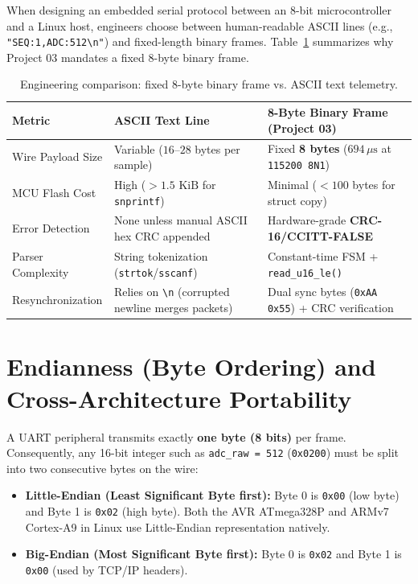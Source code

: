 \documentclass[11pt,a4paper,oneside]{report}
\begin{document}
When designing an embedded serial protocol between an 8-bit microcontroller and a Linux host, engineers choose between human-readable ASCII lines (e.g., \texttt{"SEQ:1,ADC:512\textbackslash n"}) and fixed-length binary frames. Table~\ref{tab:ch2_bin_vs_ascii} summarizes why Project 03 mandates a fixed 8-byte binary frame.

\begin{table}[!htbp]
\centering
\caption{Engineering comparison: fixed 8-byte binary frame vs. ASCII text telemetry.}
\label{tab:ch2_bin_vs_ascii}
\begin{tabularx}{\linewidth}{l X X}
\toprule
\textbf{Metric} & \textbf{ASCII Text Line} & \textbf{8-Byte Binary Frame (Project 03)} \\
\midrule
Wire Payload Size & Variable ($16\text{--}28$ bytes per sample) & Fixed \textbf{8 bytes} ($694\,\mu\text{s}$ at \texttt{115200 8N1}) \\
MCU Flash Cost & High ($>1.5\text{ KiB}$ for \texttt{snprintf}) & Minimal ($<100$ bytes for struct copy) \\
Error Detection & None unless manual ASCII hex CRC appended & Hardware-grade \textbf{CRC-16/CCITT-FALSE} \\
Parser Complexity & String tokenization (\texttt{strtok}/\texttt{sscanf}) & Constant-time FSM + \texttt{read\_u16\_le()} \\
Resynchronization & Relies on \texttt{\textbackslash n} (corrupted newline merges packets) & Dual sync bytes (\texttt{0xAA 0x55}) + CRC verification \\
\bottomrule
\end{tabularx}
\end{table}

\section{Endianness (Byte Ordering) and Cross-Architecture Portability}

A UART peripheral transmits exactly \textbf{one byte (8 bits)} per frame. Consequently, any 16-bit integer such as \texttt{adc\_raw = 512} (\texttt{0x0200}) must be split into two consecutive bytes on the wire:
\begin{itemize}
\item \textbf{Little-Endian (Least Significant Byte first):} Byte 0 is \texttt{0x00} (low byte) and Byte 1 is \texttt{0x02} (high byte). Both the AVR ATmega328P and ARMv7 Cortex-A9 in Linux use Little-Endian representation natively.
\item \textbf{Big-Endian (Most Significant Byte first):} Byte 0 is \texttt{0x02} and Byte 1 is \texttt{0x00} (used by TCP/IP headers).
\end{itemize}
\end{document}
